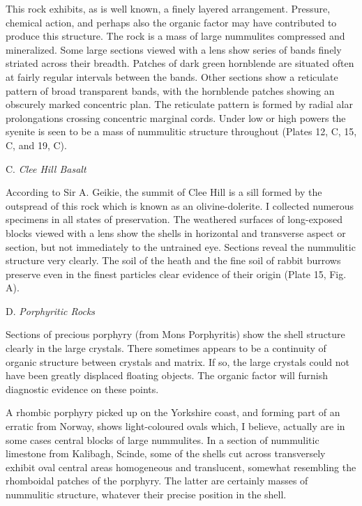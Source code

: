 \documentclass[a4paper, 12pt, oneside]{article}
\begin{document}
This rock exhibits, as is well known, a finely layered arrangement. Pressure, chemical action, and perhaps also the organic factor may have contributed to produce this structure. The rock is a mass of large nummulites compressed and mineralized. Some large sections viewed with a lens show series of bands finely striated across their breadth. Patches of dark green hornblende are situated often at fairly regular intervals between the bands. Other sections show a reticulate pattern of broad transparent bands, with the hornblende patches showing an obscurely marked concentric plan. The reticulate pattern is formed by radial alar prolongations crossing concentric marginal cords. Under low or high powers the syenite is seen to be a mass of nummulitic structure throughout (Plates 12, C, 15, C, and 19, C).

\bigskip
\centerline{C. \emph{Clee Hill Basalt}}

According to Sir A. Geikie, the summit of Clee Hill is a sill formed by the outspread of this rock which is known as an olivine-dolerite. I collected numerous specimens in all states of preservation. The weathered surfaces of long-exposed blocks viewed with a lens show the shells in horizontal and transverse aspect or section, but not immediately to the untrained eye. Sections reveal the nummulitic structure very clearly. The soil of the heath and the fine soil of rabbit burrows preserve even in the finest particles clear evidence of their origin (Plate 15, Fig. A).

\bigskip
\centerline{D. \emph{Porphyritic Rocks}}

Sections of precious porphyry (from Mons Porphyritis) show the shell structure clearly in the large crystals. There sometimes appears to be a continuity of organic structure between crystals and matrix. If so, the large crystals could not have been greatly displaced floating objects. The organic factor will furnish diagnostic evidence on these points.

A rhombic porphyry picked up on the Yorkshire coast, and forming part of an erratic from Norway, shows light-coloured ovals which, I believe, actually are in some cases central blocks of large nummulites. In a section of nummulitic limestone from Kalibagh, Scinde, some of the shells cut across transversely exhibit oval central areas homogeneous and translucent, somewhat resembling the rhomboidal patches of the porphyry. The latter are certainly masses of nummulitic structure, whatever their precise position in the shell.
\end{document}
